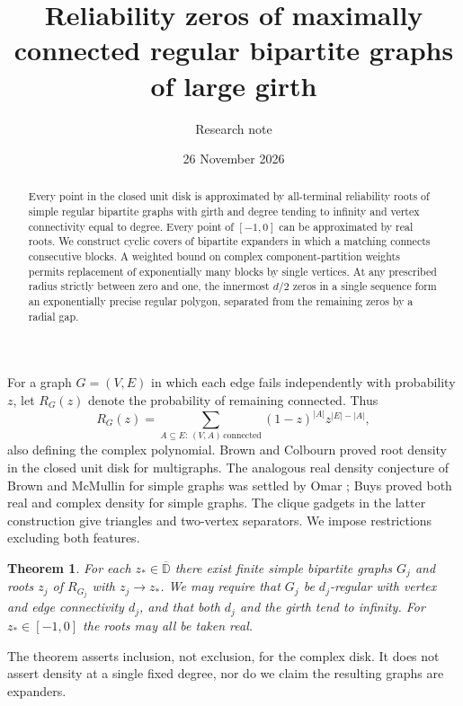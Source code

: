 \documentclass[11pt]{article}
\title{Reliability zeros of maximally connected regular bipartite graphs of large girth}
\author{Research note}
\date{26 November 2026}
\newtheorem{theorem}{Theorem}
\begin{document}
\maketitle
\begin{abstract}
Every point in the closed unit disk is approximated by all-terminal reliability roots of simple regular bipartite graphs with girth and degree tending to infinity and vertex connectivity equal to degree. Every point of $[-1,0]$ can be approximated by real roots. We construct cyclic covers of bipartite expanders in which a matching connects consecutive blocks. A weighted bound on complex component-partition weights permits replacement of exponentially many blocks by single vertices. At any prescribed radius strictly between zero and one, the innermost $d/2$ zeros in a single sequence form an exponentially precise regular polygon, separated from the remaining zeros by a radial gap.
\end{abstract}

For a graph $G=(V,E)$ in which each edge fails independently with probability $z$, let $R_G(z)$ denote the probability of remaining connected. Thus
\[
 R_G(z)=\sum_{A\subseteq E:\,(V,A)\,\mathrm{connected}}
                  (1-z)^{|A|} z^{|E|-|A|},
\]
also defining the complex polynomial. Brown and Colbourn \cite{BC} proved root density in the closed unit disk for multigraphs. The analogous real density conjecture of Brown and McMullin \cite{BM} for simple graphs was settled by Omar \cite{Omar}; Buys \cite{Buys} proved both real and complex density for simple graphs. The clique gadgets in the latter construction give triangles and two-vertex separators. We impose restrictions excluding both features.

\begin{theorem}\label{main}
For each $z_*\in\overline{\mathbb D}$ there exist finite simple bipartite graphs $G_j$ and roots $z_j$ of $R_{G_j}$ with $z_j\to z_*$. We may require that $G_j$ be $d_j$-regular with vertex and edge connectivity $d_j$, and that both $d_j$ and the girth tend to infinity. For $z_*\in[-1,0]$ the roots may all be taken real.
\end{theorem}
The theorem asserts inclusion, not exclusion, for the complex disk. It does not assert density at a single fixed degree, nor do we claim the resulting graphs are expanders.
\end{document}
